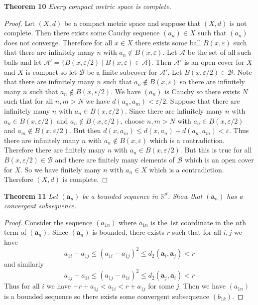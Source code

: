 \documentclass{article}
\begin{document}
\begin{flushleft}
\textbf{Theorem 10}
\textsl{Every compact metric space is complete.}
\begin{proof}
Let $(X,d)$ be a compact metric space and suppose that $(X,d)$ is not complete. Then there exists some Cauchy sequence $(a_n) \in X$ such that $(a_n)$ does not converge. Therefore for all $x \in X$ there exists some ball $B(x,\varepsilon)$ such that there are infinitely many $n$ with $a_n \notin B(x,\varepsilon)$. Let $\mathcal{A}$ be the set of all such balls and let $\mathcal{A}' = \{B(x,\varepsilon/2) \mid B(x, \varepsilon) \in \mathcal{A}\}$. Then $\mathcal{A}'$ is an open cover for $X$ and $X$ is compact so let $\mathcal{B}$ be a finite subcover for $\mathcal{A}'$. Let $B(x,\varepsilon/2) \in \mathcal{B}$. Note that there are infinitely many $n$ such that $a_n \notin B(x,\varepsilon)$ so there are infinitely many $n$ such that $a_n \notin B(x, \varepsilon/2)$. We have $(a_n)$ is Cauchy so there exists $N$ such that for all $n,m > N$ we have $d(a_n,a_m) < \varepsilon/2$. Suppose that there are infinitely many $n$ with $a_n \in B(x, \varepsilon/2)$. Since there are infinitely many $n$ with $a_n \in B(x, \varepsilon/2)$ and $a_n \notin B(x, \varepsilon/2)$, choose $n,m>N$ with $a_n \in B(x, \varepsilon/2)$ and $a_m \notin B(x, \varepsilon/2)$. But then $d(x,a_m) \leq d(x,a_n) + d(a_n,a_m) < \varepsilon$. Thus there are infinitely many $n$ with $a_n \notin B(x,\varepsilon)$ which is a contradiction. Therefore there are finitely many $n$ with $a_n \in B(x,\varepsilon/2)$. But this is true for all $B(x,\varepsilon/2) \in \mathcal{B}$ and there are finitely many elements of $\mathcal{B}$ which is an open cover for $X$. So we have finitely many $n$ with $a_n \in X$ which is a contradiction. Therefore $(X,d)$ is complete.
\end{proof}

\textbf{Theorem 11}
\textsl{Let $(\mathbf{a}_n)$ be a bounded sequence in $\mathbb{R}^d$. Show that $(\mathbf{a}_n)$ has a convergent subsequence.}
\begin{proof}
Consider the sequence $(a_{1n})$ where $a_{1n}$ is the $1$st coordinate in the $n$th term of $(\mathbf{a}_n)$. Since $(\mathbf{a}_n)$ is bounded, there exists $r$ such that for all $i,j$ we have
\[
a_{1i} - a_{1j} \leq (a_{1i} - a_{1j})^2 \leq d_2(\mathbf{a}_i, \mathbf{a}_j) < r
\]
and similarly
\[
a_{1j} - a_{1i} \leq (a_{1j} - a_{1i})^2 \leq d_2(\mathbf{a}_j, \mathbf{a}_i) < r
\]
Thus for all $i$ we have $-r + a_{1j} < a_{1i} < r + a_{1j}$ for some $j$. Then we have $(a_{1n})$ is a bounded sequence so there exists some convergent subsequence $(b_{1k})$.\newline


\end{proof}
\end{flushleft}
\end{document}

